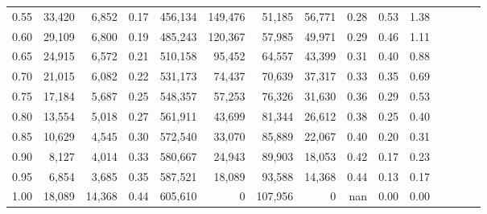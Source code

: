 \begin{tabular}{rrrcrrrrrrrrrrr}
0.55 &  33,420 &   6,852 &                                       0.17 &  456,134 &  149,476 &   51,185 &   56,771 &  0.28 &  0.53 &                         1.38 \\
0.60 &  29,109 &   6,800 &                                       0.19 &  485,243 &  120,367 &   57,985 &   49,971 &  0.29 &  0.46 &                         1.11 \\
0.65 &  24,915 &   6,572 &                                       0.21 &  510,158 &   95,452 &   64,557 &   43,399 &  0.31 &  0.40 &                         0.88 \\
0.70 &  21,015 &   6,082 &                                       0.22 &  531,173 &   74,437 &   70,639 &   37,317 &  0.33 &  0.35 &                         0.69 \\
0.75 &  17,184 &   5,687 &                                       0.25 &  548,357 &   57,253 &   76,326 &   31,630 &  0.36 &  0.29 &                         0.53 \\
0.80 &  13,554 &   5,018 &                                       0.27 &  561,911 &   43,699 &   81,344 &   26,612 &  0.38 &  0.25 &                         0.40 \\
0.85 &  10,629 &   4,545 &                                       0.30 &  572,540 &   33,070 &   85,889 &   22,067 &  0.40 &  0.20 &                         0.31 \\
0.90 &   8,127 &   4,014 &                                       0.33 &  580,667 &   24,943 &   89,903 &   18,053 &  0.42 &  0.17 &                         0.23 \\
0.95 &   6,854 &   3,685 &                                       0.35 &  587,521 &   18,089 &   93,588 &   14,368 &  0.44 &  0.13 &                         0.17 \\
1.00 &  18,089 &  14,368 &                                       0.44 &  605,610 &        0 &  107,956 &        0 &   nan &  0.00 &                         0.00 \\
\bottomrule
\end{tabular}
